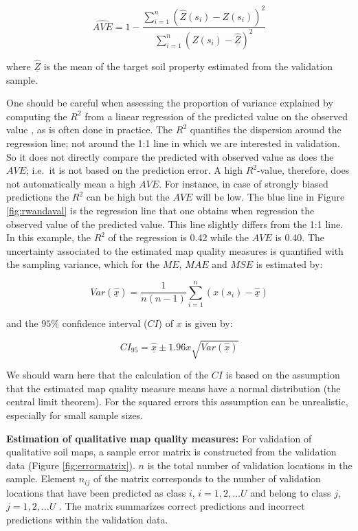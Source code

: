 \documentclass[10pt,b5paper,]{book}
\theoremstyle{definition}
\theoremstyle{definition}
\theoremstyle{definition}
\theoremstyle{remark}
\begin{document}
\begin{equation}
\widehat{A V E} = 1 - \frac{\sum_{i=1}^{n} (\hat{Z}(s_i) - Z(s_i))^2}{ \sum_{i=1}^{n} (Z(s_i) -  \underline{\hat{Z}})^2}
\end{equation}

where \(\underline{\hat{Z}}\) is the mean of the target soil property
estimated from the validation sample.

One should be careful when assessing the proportion of variance
explained by computing the \(R^2\) from a linear regression of the
predicted value on the observed value \citep{krause2005comparison}, as
is often done in practice. The \(R^2\) quantifies the dispersion around
the regression line; not around the 1:1 line in which we are interested
in validation. So it does not directly compare the predicted with
observed value as does the \(AVE\); i.e.~it is not based on the
prediction error. A high \(R^2\)-value, therefore, does not
automatically mean a high \(AVE\). For instance, in case of strongly
biased predictions the \(R^2\) can be high but the \(AVE\) will be low.
The blue line in Figure \ref{fig:rwandaval} is the regression line that
one obtains when regression the observed value of the predicted value.
This line slightly differs from the 1:1 line. In this example, the
\(R^2\) of the regression is 0.42 while the \(AVE\) is 0.40. The
uncertainty associated to the estimated map quality measures is
quantified with the sampling variance, which for the \(ME\), \(MAE\) and
\(MSE\) is estimated by:

\begin{equation}
Var(\underline{\hat{x}}) = \frac{1}{n(n-1)} \sum_{i=1}^{n} (x(s_i) -  \underline{\hat{x}})
\end{equation}

and the \(95\%\) confidence interval (\(CI\)) of \(x\) is given by:

\begin{equation}
CI_{95} = \underline{\hat{x}} \pm 1.96x\sqrt{Var(\underline{\hat{x}})}
\end{equation}

We should warn here that the calculation of the \(CI\) is based on the
assumption that the estimated map quality measure means have a normal
distribution (the central limit theorem). For the squared errors this
assumption can be unrealistic, especially for small sample sizes.

\textbf{Estimation of qualitative map quality measures:} For validation
of qualitative soil maps, a sample error matrix is constructed from the
validation data (Figure \ref{fig:errormatrix}). \(n\) is the total
number of validation locations in the sample. Element \(n_{ij}\) of the
matrix corresponds to the number of validation locations that have been
predicted as class \(i\), \(i = 1, 2, \dots U\) and belong to class
\(j\), \(j = 1, 2, \dots U\) \citep{lark1995components}. The matrix
summarizes correct predictions and incorrect predictions within the
validation data.
\end{document}

